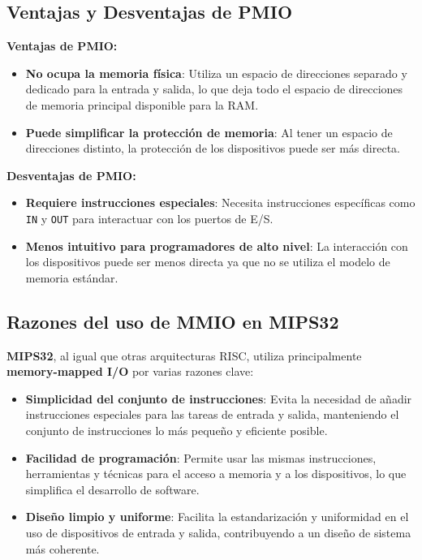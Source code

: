 \documentclass{article}
\begin{document}
	\subsection{Ventajas y Desventajas de PMIO}
	\textbf{Ventajas de PMIO:}
	\begin{itemize}
		\item \textbf{No ocupa la memoria física}: Utiliza un espacio de direcciones separado y dedicado para la entrada y salida, lo que deja todo el espacio de direcciones de memoria principal disponible para la RAM.
		\item \textbf{Puede simplificar la protección de memoria}: Al tener un espacio de direcciones distinto, la protección de los dispositivos puede ser más directa.
	\end{itemize}
	\textbf{Desventajas de PMIO:}
	\begin{itemize}
		\item \textbf{Requiere instrucciones especiales}: Necesita instrucciones específicas como \texttt{IN} y \texttt{OUT} para interactuar con los puertos de E/S.
		\item \textbf{Menos intuitivo para programadores de alto nivel}: La interacción con los dispositivos puede ser menos directa ya que no se utiliza el modelo de memoria estándar.
	\end{itemize}
	
	\subsection{Razones del uso de MMIO en MIPS32}
	\textbf{MIPS32}, al igual que otras arquitecturas RISC, utiliza principalmente \textbf{memory-mapped I/O} por varias razones clave:
	\begin{itemize}
		\item \textbf{Simplicidad del conjunto de instrucciones}: Evita la necesidad de añadir instrucciones especiales para las tareas de entrada y salida, manteniendo el conjunto de instrucciones lo más pequeño y eficiente posible.
		\item \textbf{Facilidad de programación}: Permite usar las mismas instrucciones, herramientas y técnicas para el acceso a memoria y a los dispositivos, lo que simplifica el desarrollo de software.
		\item \textbf{Diseño limpio y uniforme}: Facilita la estandarización y uniformidad en el uso de dispositivos de entrada y salida, contribuyendo a un diseño de sistema más coherente.
	\end{itemize}
	
\end{document}
